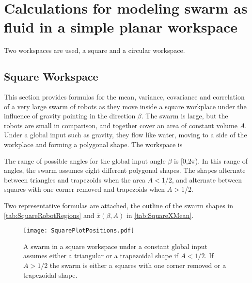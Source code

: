 \section{Calculations for modeling swarm as fluid in a simple planar workspace}\label{sec:fluidInPlanarRegion}
Two workspaces are used, a square and a circular workspace.

\subsection{Square Workspace}
This section provides formulas for the mean, variance,  covariance and correlation of a very large swarm of robots as they move inside a square workplace under the influence of gravity pointing in the direction $\beta$. The swarm is large, but the robots are small in comparison, and together cover an area of constant volume $A$. Under a global input such as gravity, they flow like water, moving to a side of the workplace and forming a polygonal shape. The workspace is 

The range of possible angles for the global input angle $\beta $ is [0,2$\pi $). In this range of angles, the swarm assumes eight different polygonal shapes. The shapes alternate between triangles and trapezoids when the area $A$$<$1/2, and alternate between squares with one corner removed and trapezoids when $A$$>$1/2.

Two representative formulas are attached, the outline of the swarm shapes in \eqref{tab:SquareRobotRegions} and $\bar{x}(\beta,A)$ in \eqref{tab:SquareXMean}.




\begin{figure}[h]
\begin{center}
\texttt{[image: SquarePlotPositions.pdf]} 
\caption{A swarm in a square workspace under a constant global input assumes either a triangular or a trapezoidal shape if $A<1/2$.  If $A>1/2$ the swarm is either a squares with one corner removed or a trapezoidal  shape.}
\label{fig:friction}
\end{center}
\end{figure} 

